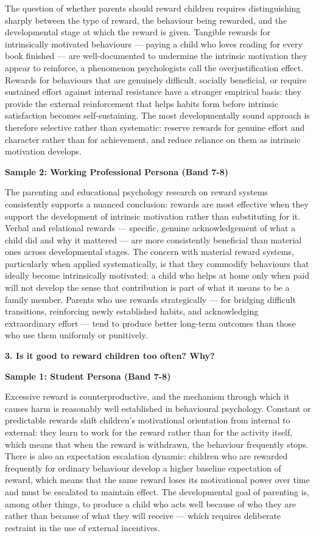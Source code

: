 The question of whether parents should reward children requires distinguishing sharply between the type of reward, the behaviour being rewarded, and the developmental stage at which the reward is given. Tangible rewards for intrinsically motivated behaviours — paying a child who loves reading for every book finished — are well-documented to undermine the intrinsic motivation they appear to reinforce, a phenomenon psychologists call the overjustification effect. Rewards for behaviours that are genuinely difficult, socially beneficial, or require sustained effort against internal resistance have a stronger empirical basis: they provide the external reinforcement that helps habits form before intrinsic satisfaction becomes self-sustaining. The most developmentally sound approach is therefore selective rather than systematic: reserve rewards for genuine effort and character rather than for achievement, and reduce reliance on them as intrinsic motivation develops.

\textbf{Sample 2: Working Professional Persona (Band 7-8)}

The parenting and educational psychology research on reward systems consistently supports a nuanced conclusion: rewards are most effective when they support the development of intrinsic motivation rather than substituting for it. Verbal and relational rewards — specific, genuine acknowledgement of what a child did and why it mattered — are more consistently beneficial than material ones across developmental stages. The concern with material reward systems, particularly when applied systematically, is that they commodify behaviours that ideally become intrinsically motivated: a child who helps at home only when paid will not develop the sense that contribution is part of what it means to be a family member. Parents who use rewards strategically — for bridging difficult transitions, reinforcing newly established habits, and acknowledging extraordinary effort — tend to produce better long-term outcomes than those who use them uniformly or punitively.

\separator

\begin{ieltsquestion}
\textbf{3. Is it good to reward children too often? Why?}
\end{ieltsquestion}
\textbf{Sample 1: Student Persona (Band 7-8)}

Excessive reward is counterproductive, and the mechanism through which it causes harm is reasonably well established in behavioural psychology. Constant or predictable rewards shift children's motivational orientation from internal to external: they learn to work for the reward rather than for the activity itself, which means that when the reward is withdrawn, the behaviour frequently stops. There is also an expectation escalation dynamic: children who are rewarded frequently for ordinary behaviour develop a higher baseline expectation of reward, which means that the same reward loses its motivational power over time and must be escalated to maintain effect. The developmental goal of parenting is, among other things, to produce a child who acts well because of who they are rather than because of what they will receive — which requires deliberate restraint in the use of external incentives.

